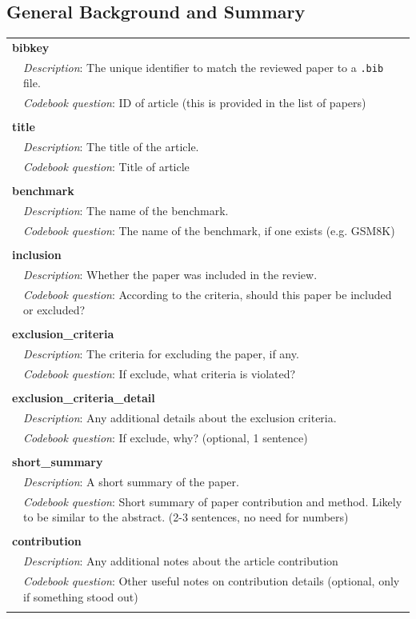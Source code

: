 \subsection{General Background and Summary}
{\small\begin{longtable}{p{}p{}}
\multicolumn{2}{l}{\textbf{bibkey}} \\
& \textit{Description}: The unique identifier to match the reviewed paper to a \texttt{.bib} file. \\
& \textit{Codebook question}: ID of article (this is provided in the list of papers) \\
\\
\multicolumn{2}{l}{\textbf{title}} \\
& \textit{Description}: The title of the article. \\
& \textit{Codebook question}: Title of article \\
\\
\multicolumn{2}{l}{\textbf{benchmark}} \\
& \textit{Description}: The name of the benchmark. \\
& \textit{Codebook question}: The name of the benchmark, if one exists (e.g. GSM8K) \\
\\
\multicolumn{2}{l}{\textbf{inclusion}} \\
& \textit{Description}: Whether the paper was included in the review. \\
& \textit{Codebook question}: According to the criteria, should this paper be included or excluded? \\
\\
\multicolumn{2}{l}{\textbf{exclusion\_criteria}} \\
& \textit{Description}: The criteria for excluding the paper, if any. \\
& \textit{Codebook question}: If exclude, what criteria is violated? \\
\\
\multicolumn{2}{l}{\textbf{exclusion\_criteria\_detail}} \\
& \textit{Description}: Any additional details about the exclusion criteria. \\
& \textit{Codebook question}: If exclude, why? (optional, 1 sentence) \\
\\
\multicolumn{2}{l}{\textbf{short\_summary}} \\
& \textit{Description}: A short summary of the paper. \\
& \textit{Codebook question}: Short summary of paper contribution and method. Likely to be similar to the abstract. (2-3 sentences, no need for numbers) \\
\\
\multicolumn{2}{l}{\textbf{contribution}} \\
& \textit{Description}: Any additional notes about the article contribution \\
& \textit{Codebook question}: Other useful notes on contribution details (optional, only if something stood out) \\
\\
\end{longtable}}

